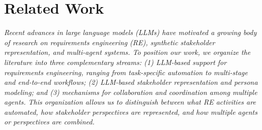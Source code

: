 \chapter{Related Work}
\label{chap:related-work}
\textit{Recent advances in large language models (LLMs) have motivated a growing body of research on requirements engineering (RE), synthetic stakeholder representation, and multi-agent systems. To position our work, we organize the literature into three complementary streams: (1) LLM-based support for requirements engineering, ranging from task-specific automation to multi-stage and end-to-end workflows; (2) LLM-based stakeholder representation and persona modeling; and (3) mechanisms for collaboration and coordination among multiple agents. This organization allows us to distinguish between what RE activities are automated, how stakeholder perspectives are represented, and how multiple agents or perspectives are combined.}





